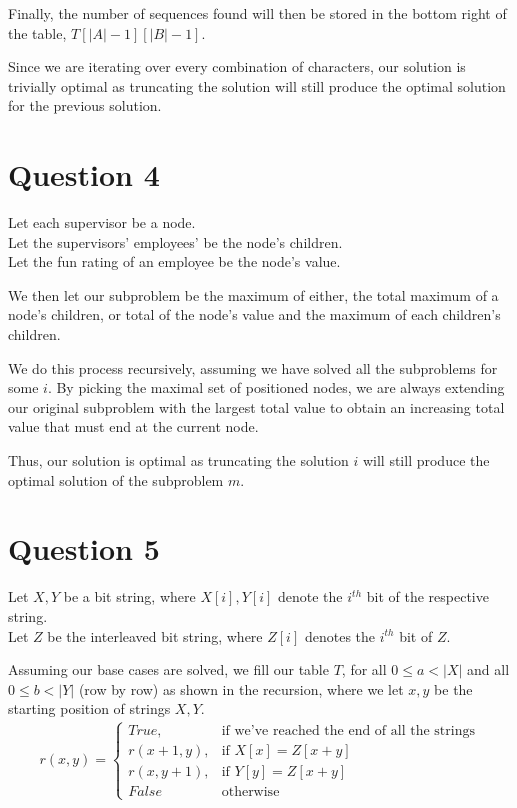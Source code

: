 \documentclass{article}
\begin{document}
Finally, the number of sequences found will then be stored in the bottom right of the table, $T[|A|-1][|B|-1]$.

Since we are iterating over every combination of characters, our solution is trivially optimal as truncating the solution will still produce the optimal solution for the previous solution.

\pagebreak
\section*{Question 4}
Let each supervisor be a node.\\
Let the supervisors' employees' be the node's children.\\
Let the fun rating of an employee be the node's value.

We then let our subproblem be the maximum of either, the total maximum of a node's children, or total of the node's value and the maximum of each children's children.

We do this process recursively, assuming we have solved all the subproblems for some $i$. By picking the maximal set of positioned nodes, we are always extending our original subproblem with the largest total value to obtain an increasing total value that must end at the current node.

Thus, our solution is optimal as truncating the solution $i$ will still produce the optimal solution of the subproblem $m$.

\section*{Question 5}
Let $X, Y$ be a bit string, where $X[i], Y[i]$ denote the $i^{th}$ bit of the respective string.\\
Let $Z$ be the interleaved bit string, where $Z[i]$ denotes the $i^{th}$ bit of $Z$.

Assuming our base cases are solved, we fill our table $T$, for all $0 \leq a < |X|$ and all $0 \leq b < |Y|$ (row by row) as shown in the recursion, where we let $x, y$ be the starting position of strings $X, Y$.
\begin{align*}
r(x, y) =
\begin{cases}
    True,       & \text{if we've reached the end of all the strings}\\
    r(x+1, y),  & \text{if } X[x] = Z[x + y]\\
    r(x, y+1),  & \text{if } Y[y] = Z[x + y]\\
    False       & \text{otherwise}
\end{cases}
\end{align*}
\end{document}
